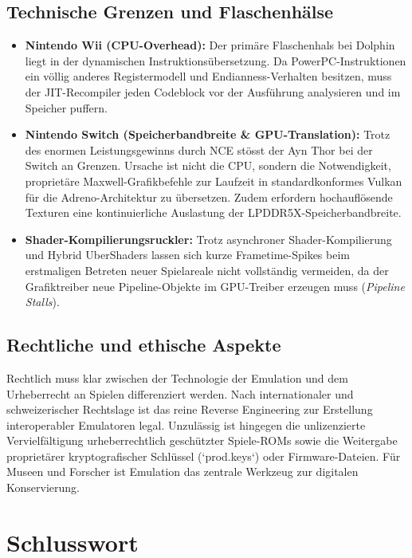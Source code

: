 \documentclass[12pt,a4paper]{scrartcl}
\begin{document}
\subsection{Technische Grenzen und Flaschenhälse}
\begin{itemize}[leftmargin=1.8em]
    \item \textbf{Nintendo Wii (CPU-Overhead):} Der primäre Flaschenhals bei Dolphin liegt in der dynamischen Instruktionsübersetzung. Da PowerPC-Instruktionen ein völlig anderes Registermodell und Endianness-Verhalten besitzen, muss der JIT-Recompiler jeden Codeblock vor der Ausführung analysieren und im Speicher puffern.
    \item \textbf{Nintendo Switch (Speicherbandbreite \& GPU-Translation):} Trotz des enormen Leistungsgewinns durch NCE stösst der Ayn Thor bei der Switch an Grenzen. Ursache ist nicht die CPU, sondern die Notwendigkeit, proprietäre Maxwell-Grafikbefehle zur Laufzeit in standardkonformes Vulkan für die Adreno-Architektur zu übersetzen. Zudem erfordern hochauflösende Texturen eine kontinuierliche Auslastung der LPDDR5X-Speicherbandbreite.
    \item \textbf{Shader-Kompilierungsruckler:} Trotz asynchroner Shader-Kompilierung und Hybrid UberShaders lassen sich kurze Frametime-Spikes beim erstmaligen Betreten neuer Spielareale nicht vollständig vermeiden, da der Grafiktreiber neue Pipeline-Objekte im GPU-Treiber erzeugen muss (\textit{Pipeline Stalls}).
\end{itemize}

\subsection{Rechtliche und ethische Aspekte}
Rechtlich muss klar zwischen der Technologie der Emulation und dem Urheberrecht an Spielen differenziert werden. Nach internationaler und schweizerischer Rechtslage ist das reine Reverse Engineering zur Erstellung interoperabler Emulatoren legal. Unzulässig ist hingegen die unlizenzierte Vervielfältigung urheberrechtlich geschützter Spiele-ROMs sowie die Weitergabe proprietärer kryptografischer Schlüssel (`prod.keys`) oder Firmware-Dateien. Für Museen und Forscher ist Emulation das zentrale Werkzeug zur digitalen Konservierung.

\newpage

\section{Schlusswort}
\label{sec:fazit}
\end{document}
